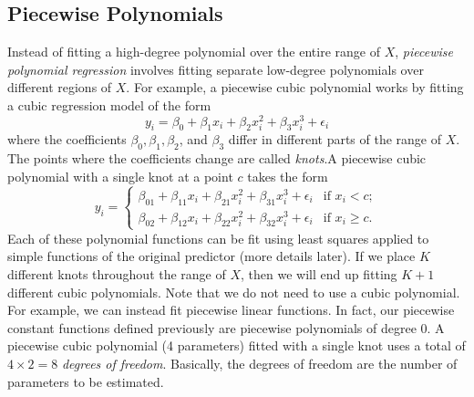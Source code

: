 \subsection{Piecewise Polynomials}
Instead of fitting a high-degree polynomial over the entire range of $X$, \textit{piecewise polynomial regression} involves fitting separate low-degree polynomials over different regions of $X$. For example, a piecewise cubic polynomial works by fitting a cubic regression model of the form
\begin{equation}
     y_i = \beta_0 + \beta_1x_i + \beta_2x_i^2 + \beta_3x_i^3 + \epsilon_i
     \label{cubic-pol}
\end{equation}
where the coefficients $\beta_0, \beta_1, \beta_2$, and $\beta_3$ differ in different parts of the range of $X$. The points where the coefficients change are called \textit{knots}.A piecewise cubic polynomial with a single knot at a point $c$ takes the form
\[
y_i =
\begin{cases}
     \beta_{01} + \beta_{11}x_i + \beta_{21}x_i^2 + \beta_{31}x_i^3 + \epsilon_i & \text{if } x_i < c;\\
\beta_{02} + \beta_{12}x_i + \beta_{22}x_i^2 + \beta_{32}x_i^3 + \epsilon_i & \text{if } x_i \geq c.   
\end{cases}
\]
Each of these polynomial functions can be fit using least squares applied to simple functions of the original predictor (more details later). If we place $K$ different knots throughout the range of $X$, then we will end up fitting $K + 1$ different cubic polynomials. Note that we do not need to use a cubic polynomial. For example, we can instead fit piecewise linear functions. In fact, our piecewise constant functions defined previously are piecewise polynomials of degree 0. A piecewise cubic polynomial (4 parameters) fitted with a single knot uses a total of $4 \times 2 = 8$ \textit{degrees of freedom}. Basically, the degrees of freedom are the number of parameters to be estimated.

